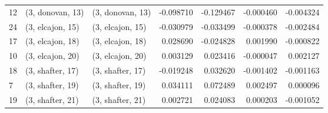 \begin{tabular}{lllrrrr}
12 &  (3, donovan, 13) &  (3, donovan, 13) & -0.098710 & -0.129467 &  -0.000460 & -0.004324 \\
24 &  (3, elcajon, 15) &  (3, elcajon, 15) & -0.030979 & -0.033499 &  -0.000378 & -0.002484 \\
17 &  (3, elcajon, 18) &  (3, elcajon, 18) &  0.028690 & -0.024828 &   0.001990 & -0.000822 \\
10 &  (3, elcajon, 20) &  (3, elcajon, 20) &  0.003129 &  0.023416 &  -0.000047 &  0.002127 \\
18 &  (3, shafter, 17) &  (3, shafter, 17) & -0.019248 &  0.032620 &  -0.001402 & -0.001163 \\
7  &  (3, shafter, 19) &  (3, shafter, 19) &  0.034111 &  0.072489 &   0.002497 &  0.000096 \\
19 &  (3, shafter, 21) &  (3, shafter, 21) &  0.002721 &  0.024083 &   0.000203 & -0.001052 \\
\bottomrule
\end{tabular}
